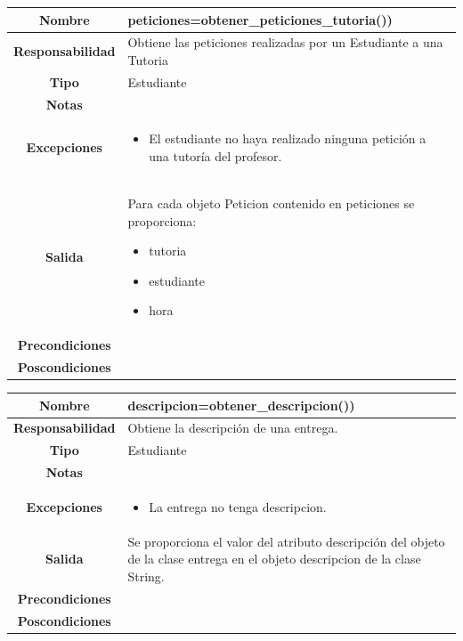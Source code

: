                        \begin{table}[!ht]
\begin{tabular}{|c|m{10cm}|}
\hline\rowcolor{Gray}
{\bf Nombre } & {peticiones=obtener\_peticiones\_tutoria())}\\
\hline
{\bf Responsabilidad } & {Obtiene las peticiones realizadas por un Estudiante a una Tutoria}\\
\hline
\rowcolor{Gray}
{\bf Tipo } & {Estudiante} \\
\hline
{\bf Notas } & { } \\
\hline
\rowcolor{Gray}
{\bf Excepciones }& {
\begin{itemize}
\item El estudiante no haya realizado ninguna petición a una tutoría del profesor.
\end{itemize}

} \\
\hline
{\bf Salida }& 
	  { Para cada objeto Peticion contenido en peticiones se proporciona:
	  \begin{itemize}
	  \item tutoria
	  \item estudiante
	  \item hora
	  \end{itemize}
} 
 \\
\hline
\rowcolor{Gray}
{\bf Precondiciones }& {
}\\
\hline
{\bf Poscondiciones }& { 
  }
  \\
\hline
\end{tabular}

\end{table}







                       \begin{table}[!ht]
\begin{tabular}{|c|m{10cm}|}
\hline\rowcolor{Gray}
{\bf Nombre } & {descripcion=obtener\_descripcion())}\\
\hline
{\bf Responsabilidad } & {Obtiene la descripción de una entrega.}\\
\hline
\rowcolor{Gray}
{\bf Tipo } & {Estudiante} \\
\hline
{\bf Notas } & { } \\
\hline
\rowcolor{Gray}
{\bf Excepciones }& {
\begin{itemize}
\item La entrega no tenga descripcion.
\end{itemize}
} \\
\hline
{\bf Salida }& 
	  { Se proporciona el valor del atributo descripción del objeto de la clase entrega en el objeto descripcion de la clase String.
} 
 \\
\hline
\rowcolor{Gray}
{\bf Precondiciones }& {
}\\
\hline
{\bf Poscondiciones }& { 
  }
  \\
\hline
\end{tabular}

\end{table}




